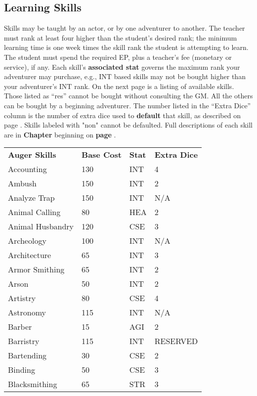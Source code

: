 \begin{multicols*}{2}
\subsection{Learning Skills}
Skills may be taught by an actor, or by one adventurer to another. The teacher must rank at least four higher than the student’s desired rank; the minimum learning time is one week times the skill rank the student is attempting to learn. The student must spend the required EP, plus a teacher’s fee (monetary or service), if any.
Each skill’s \textbf{associated stat} governs the maximum rank your adventurer may purchase, e.g., INT based skills may not be bought higher than your adventurer’s INT rank.
On the next page is a listing of available skills. Those listed as “res” cannot be bought without consulting the GM. All the others can be bought by a beginning adventurer. The number listed in the “Extra Dice” column is the number of extra dice used to \textbf{default} that skill, as described on page \textbf{\pageref{create-skills-list}}. Skills labeled with "non" cannot be defaulted. Full descriptions of each skill are in \textbf{Chapter } beginning on \textbf{page \pageref{ch:skills}}.
\begin{tcolorbox}[breakable,boxrule=0pt]
\begin{xtabular}{l l l l}
\textbf{Auger Skills} & \textbf{Base Cost} & \textbf{Stat} & \textbf{Extra Dice}\\
Accounting & 130 & INT & 4 \\
Ambush & 150 & INT & 2 \\
Analyze Trap & 150 & INT & N/A \\
Animal Calling & 80 & HEA & 2 \\
Animal Husbandry & 120 & CSE & 3 \\
Archeology & 100 & INT & N/A \\
Architecture & 65 & INT & 3 \\
Armor Smithing & 65 & INT & 2 \\
Arson & 50 & INT & 2 \\
Artistry & 80 & CSE & 4 \\
Astronomy & 115 & INT & N/A \\
Barber & 15 & AGI & 2 \\
Barristry & 115 & INT & RESERVED \\
Bartending & 30 & CSE & 2 \\
Binding & 50 & CSE & 3 \\
Blacksmithing & 65 & STR & 3 \\

\end{xtabular}
\end{tcolorbox}
\end{multicols*}
